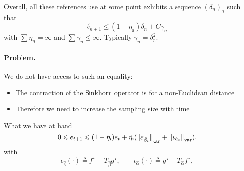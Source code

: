 \documentclass[a4paper, 10pt]{article}
\begin{document}
Overall, all these references use at some point exhibits a sequence $(\delta_n)_n$ such that
\begin{equation}
    \delta_{n+1} \leq (1 - \eta_n) \delta_n + C \gamma_n
\end{equation}
with $\sum \eta_n = \infty$ and $\sum \gamma_n \leq \infty$. Typically $\gamma_n = \delta_n^2$.


\paragraph{Problem.} We do not have access to such an equality:
\begin{itemize}
    \item The contraction of the Sinkhorn operator is for a non-Euclidean distance
    \item Therefore we need to increase the sampling size with time
\end{itemize}

What we have at hand
\begin{equation}\label{eq:Et_rec}
    0 \leqslant e_{t+1} \leqslant 
    (1 - \tilde \eta_t) e_t
    + \tilde \eta_t
    ({\Vert \varepsilon_{\hat \beta_t} \Vert}_{\text{var}} + 
    {\Vert \iota_{\hat \alpha_t} \Vert}_{\text{var}}).
\end{equation}
with
\begin{equation}
    \epsilon_{\hat \beta}(\cdot) \triangleq
    f^\star - T_{\hat \beta}{g^\star} ,\qquad
    \iota_{\hat \alpha}(\cdot) \triangleq 
    g^\star - T_{\hat \alpha}{f^\star},
\end{equation}

\printbibliography
\end{document}
